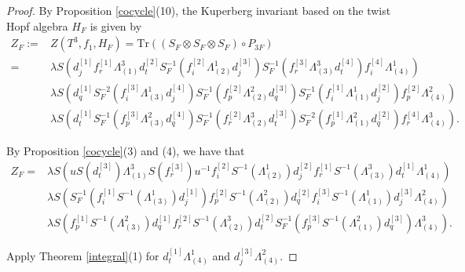 \documentclass[12pt]{amsart}
\begin{document}
\begin{proof}
By Proposition \ref{cocycle}(10), the Kuperberg invariant based on the twist Hopf algebra $H_F$ is given by 
\[\begin{aligned}
Z_F:=&Z(T^3, f_1, H_F)=\text{Tr}((S_F\otimes S_F \otimes S_F)\circ P_{3F}) \\
=& \lambda S(d^{[1]}_jf^{[1]}_r\Lambda^3_{(1)}d^{[2]}_tS_F^{-1}(f^{[2]}_i\Lambda^1_{(2)}d^{[3]}_j)S_F^{-1}(f^{[3]}_r\Lambda^3_{(3)}d^{[4]}_t)f^{[4]}_i\Lambda^1_{(4)})\\
&\lambda S(d^{[1]}_qS_F^{-2}(f^{[3]}_i\Lambda^1_{(3)}d^{[4]}_j)S_F^{-1}(f^{[2]}_p\Lambda^2_{(2)}d^{[3]}_q)S_F^{-1}(f^{[1]}_i\Lambda^1_{(1)}d^{[2]}_j)f^{[2]}_p\Lambda^2_{(4)})\\
&\lambda S(d^{[1]}_tS_F^{-1}(f^{[3]}_p\Lambda^2_{(3)}d^{[4]}_q)S_F^{-1}(f^{[2]}_r\Lambda^3_{(2)}d^{[3]}_t)S_F^{-2}(f^{[1]}_p\Lambda^2_{(1)}d^{[2]}_q)f^{[4]}_r\Lambda^3_{(4)}).
\end{aligned}\]

By Proposition \ref{cocycle}(3) and (4), we have that
\[\begin{aligned}
	Z_F
	=&\lambda S(uS(d^{[3]}_t)\Lambda^3_{(1)}S(f^{[3]}_r)u^{-1}f^{[2]}_iS^{-1}(\Lambda^1_{(2)})d^{[2]}_jf^{[1]}_rS^{-1}(\Lambda^3_{(3)})d^{[1]}_t\Lambda^1_{(4)})\\
	&\lambda S(S_F^{-1}(f^{[1]}_iS^{-1}(\Lambda^1_{(3)})d^{[1]}_j)f^{[2]}_pS^{-1}(\Lambda^2_{(2)})d^{[2]}_qf^{[3]}_iS^{-1}(\Lambda^1_{(1)})d^{[3]}_j\Lambda^2_{(4)})\\
	&\lambda S(f^{[1]}_pS^{-1}(\Lambda^2_{(3)})d^{[1]}_qf^{[2]}_rS^{-1}(\Lambda^3_{(2)})d^{[2]}_tS_F^{-1}(f^{[3]}_pS^{-1}(\Lambda^2_{(1)})d^{[3]}_q)\Lambda^3_{(4)}).
\end{aligned}\]

Apply Theorem \ref{integral}(1) for $d^{[1]}_t\Lambda^1_{(4)}$ and $d^{[3]}_j\Lambda^2_{(4)}$.


\end{proof}
\end{document}
